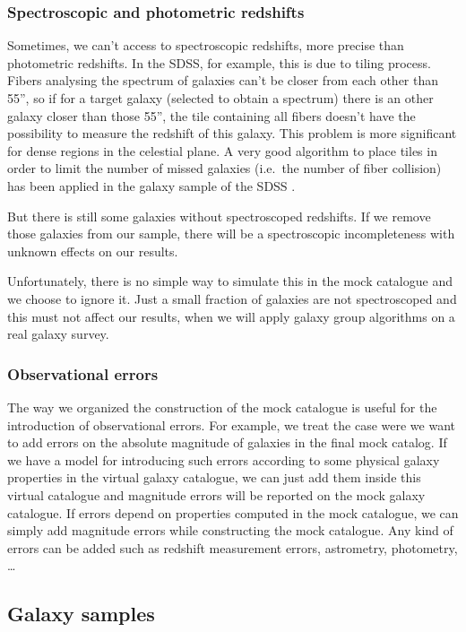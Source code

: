 \subsubsection{Spectroscopic and photometric redshifts}

Sometimes, we can't access to spectroscopic redshifts, more precise than
photometric redshifts. In the SDSS, for example, this is due to tiling process.
Fibers analysing the spectrum of galaxies can't be closer from each other than
55'', so if for a target galaxy (selected to obtain a spectrum) there is an
other galaxy closer than those 55'', the tile containing all fibers doesn't
have the possibility to measure the redshift of this galaxy. This problem is
more significant for dense regions in the celestial plane. A very good
algorithm to place tiles in order to limit the number of missed galaxies (i.e.\
the number of fiber collision) has been applied in the galaxy sample of the
SDSS \citep{Blanton+03}.

But there is still some galaxies without spectroscoped redshifts. If we remove
those galaxies from our sample, there will be a spectroscopic incompleteness
with unknown effects on our results.

Unfortunately, there is no simple way to simulate this in the mock catalogue
and we choose to ignore it. Just a small fraction of galaxies are not
spectroscoped and this must not affect our results, when we will apply galaxy
group algorithms on a real galaxy survey.

\subsubsection{Observational errors}

The way we organized the construction of the mock catalogue is useful for the
introduction of observational errors. For example, we treat the case were we
want to add errors on the absolute magnitude of galaxies in the final mock
catalog. If we have a model for introducing such errors according to some
physical galaxy properties in the virtual galaxy catalogue, we can just add them
inside this virtual catalogue and magnitude errors will be reported on the mock galaxy
catalogue. If errors depend on properties computed in the mock catalogue, we
can simply add magnitude errors while constructing the mock catalogue. Any
kind of errors can be added such as redshift measurement errors, astrometry,
photometry, \dots

\subsection{Galaxy samples}
\label{sub:galaxy_samples}

